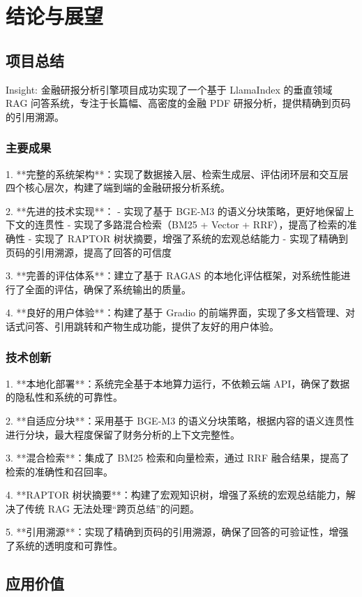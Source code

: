 \section{结论与展望}

\subsection{项目总结}

Insight: 金融研报分析引擎项目成功实现了一个基于 LlamaIndex 的垂直领域 RAG 问答系统，专注于长篇幅、高密度的金融 PDF 研报分析，提供精确到页码的引用溯源。

\subsubsection{主要成果}

1. **完整的系统架构**：实现了数据接入层、检索生成层、评估闭环层和交互层四个核心层次，构建了端到端的金融研报分析系统。

2. **先进的技术实现**：
   - 实现了基于 BGE-M3 的语义分块策略，更好地保留上下文的连贯性
   - 实现了多路混合检索（BM25 + Vector + RRF），提高了检索的准确性
   - 实现了 RAPTOR 树状摘要，增强了系统的宏观总结能力
   - 实现了精确到页码的引用溯源，提高了回答的可信度

3. **完善的评估体系**：建立了基于 RAGAS 的本地化评估框架，对系统性能进行了全面的评估，确保了系统输出的质量。

4. **良好的用户体验**：构建了基于 Gradio 的前端界面，实现了多文档管理、对话式问答、引用跳转和产物生成功能，提供了友好的用户体验。

\subsubsection{技术创新}

1. **本地化部署**：系统完全基于本地算力运行，不依赖云端 API，确保了数据的隐私性和系统的可靠性。

2. **自适应分块**：采用基于 BGE-M3 的语义分块策略，根据内容的语义连贯性进行分块，最大程度保留了财务分析的上下文完整性。

3. **混合检索**：集成了 BM25 检索和向量检索，通过 RRF 融合结果，提高了检索的准确性和召回率。

4. **RAPTOR 树状摘要**：构建了宏观知识树，增强了系统的宏观总结能力，解决了传统 RAG 无法处理“跨页总结”的问题。

5. **引用溯源**：实现了精确到页码的引用溯源，确保了回答的可验证性，增强了系统的透明度和可靠性。

\subsection{应用价值}

